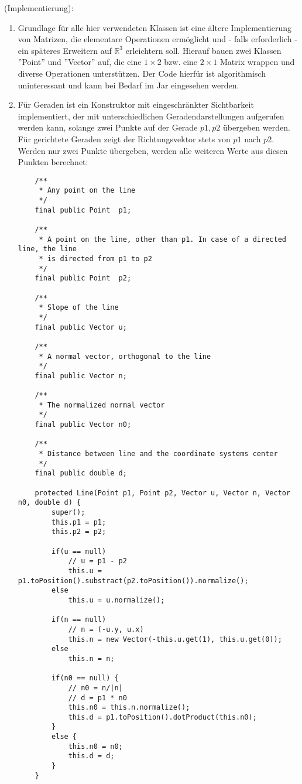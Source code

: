 \documentclass[a4paper, titlepage=false, parskip=full-, 10pt]{scrartcl}
\newcounter{tasknbr}
\newenvironment{task}[1]{{\bf Aufgabe \arabic {tasknbr}\stepcounter{tasknbr}} (#1):\begin{enumerate}}{\end{enumerate}}
\newcommand{\subtask}[1]{\item[#1)]}
\begin{document}
\begin{task}{Implementierung}
\item[]
Grundlage für alle hier verwendeten Klassen ist eine ältere Implementierung von Matrizen, die elementare Operationen ermöglicht und - falls erforderlich - ein späteres Erweitern auf $\mathbb{R}^3$ erleichtern soll. Hierauf bauen zwei Klassen ''Point'' und ''Vector'' auf, die eine $1\times 2$ bzw. eine $2\times 1$ Matrix wrappen und diverse Operationen unterstützen. Der Code hierfür ist algorithmisch uninteressant und kann bei Bedarf im Jar eingesehen werden.

\subtask{a}
Für Geraden ist ein Konstruktor mit eingeschränkter Sichtbarkeit implementiert, der mit unterschiedlichen Geradendarstellungen aufgerufen werden kann, solange zwei Punkte auf der Gerade $p1,p2$ übergeben werden. Für gerichtete Geraden zeigt der Richtungsvektor stets von $p1$ nach $p2$. Werden nur zwei Punkte übergeben, werden alle weiteren Werte aus diesen Punkten berechnet:
\lstset{language=Java}
\begin{lstlisting}
    /**
     * Any point on the line
     */
    final public Point  p1;

    /**
     * A point on the line, other than p1. In case of a directed line, the line
     * is directed from p1 to p2
     */
    final public Point  p2;

    /**
     * Slope of the line
     */
    final public Vector u;

    /**
     * A normal vector, orthogonal to the line
     */
    final public Vector n;

    /**
     * The normalized normal vector
     */
    final public Vector n0;

    /**
     * Distance between line and the coordinate systems center
     */
    final public double d;

    protected Line(Point p1, Point p2, Vector u, Vector n, Vector n0, double d) {
        super();
        this.p1 = p1;
        this.p2 = p2;

        if(u == null)
            // u = p1 - p2
            this.u = p1.toPosition().substract(p2.toPosition()).normalize();
        else
            this.u = u.normalize();

        if(n == null)
            // n = (-u.y, u.x)
            this.n = new Vector(-this.u.get(1), this.u.get(0));
        else
            this.n = n;

        if(n0 == null) {
            // n0 = n/|n|
            // d = p1 * n0
            this.n0 = this.n.normalize();
            this.d = p1.toPosition().dotProduct(this.n0);
        }
        else {
            this.n0 = n0;
            this.d = d;
        }
    }
\end{lstlisting}


\end{task}
\end{document}
